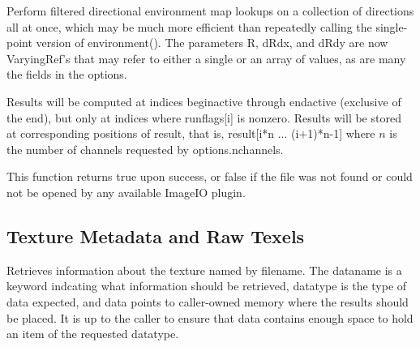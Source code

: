 
Perform filtered directional environment map lookups on a collection of
directions all at once, which may be much more efficient than repeatedly
calling the single-point version of {\cf environment()}.  The parameters
{\cf R}, {\cf dRdx}, and {\cf dRdy} are now {\cf VaryingRef}'s that may
refer to either a single or an array of values, as are many the fields in
the {\cf options}.

Results will be computed at indices {\cf beginactive} through
{\cf endactive} (exclusive of the end), but only at indices where {\cf runflags[i]}
is nonzero.  Results will be stored at corresponding positions of
{\cf result}, that is, {\cf result[i*n ... (i+1)*n-1]} where $n$ 
is the number of channels requested by {\cf options.nchannels}.

This function returns {\cf true} upon success, or {\cf false} if the
file was not found or could not be opened by any available ImageIO
plugin.
\apiend

\subsection{Texture Metadata and Raw Texels}
\label{sec:texturesys:api:gettextureinfo}
\label{sec:texturesys:api:getimagespec}


Retrieves information about the texture named by {\cf filename}.
The {\cf dataname} is a keyword indcating what information should
be retrieved, {\cf datatype} is the type of data expected, and
{\cf data} points to caller-owned memory where the results should be
placed.  It is up to the caller to ensure that {\cf data} contains
enough space to hold an item of the requested {\cf datatype}.

